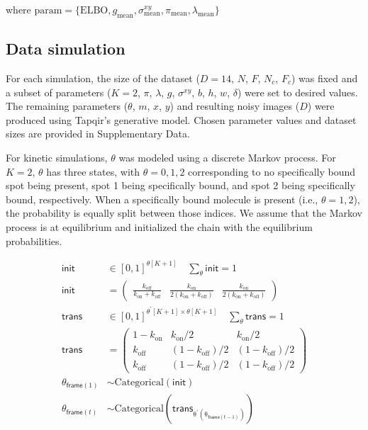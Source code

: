 \noindent where $\mathrm{param} = \{ \mathrm{ELBO}, g_\mathrm{mean}, \sigma^{xy}_\mathrm{mean}, \pi_\mathrm{mean}, \lambda_\mathrm{mean} \}$

\subsection*{Data simulation}

For each simulation, the size of the dataset ($D=14$, $N$, $F$, $N_c$, $F_c$) was fixed and a subset of parameters ($K=2$, $\pi$, $\lambda$, $g$, $\sigma^{xy}$, $b$, $h$, $w$, $\delta$) were set to desired values.  The remaining parameters ($\theta$, $m$, $x$, $y$) and resulting noisy images ($D$) were produced using Tapqir's generative model. Chosen parameter values and dataset sizes are provided in Supplementary Data.

For kinetic simulations, $\theta$ was modeled using a discrete Markov process. For $K=2$, $\theta$ has three states, with $\theta = 0, 1, 2$ corresponding to no specifically bound spot being present, spot 1 being specifically bound, and spot 2 being specifically bound, respectively. When a specifically bound molecule is present (i.e., $\theta = 1, 2$), the probability is equally split between those indices. We assume that the Markov process is at equilibrium and initialized the chain with the equilibrium probabilities.


\begin{subequations}
\begin{align}
    \mathsf{init} &\in [0, 1]^{\theta[K+1]} \quad \sum_{\theta} \mathsf{init} = 1 \\
    \mathsf{init} &= \begin{pmatrix} \frac{k_\mathrm{off}}{k_\mathrm{on} + k_\mathrm{off}} & \frac{k_\mathrm{on}}{2\left( k_\mathrm{on} + k_\mathrm{off} \right)} & \frac{k_\mathrm{on}}{2\left( k_\mathrm{on} + k_\mathrm{off} \right)} \end{pmatrix} \\
    \mathsf{trans} &\in [0, 1]^{\theta^\prime[K+1] \times \theta[K+1]} \quad \sum_{\theta} \mathsf{trans} = 1 \\
    \mathsf{trans} &= \begin{pmatrix} 1 - k_\mathrm{on} & k_\mathrm{on}/2 & k_\mathrm{on}/2 \\ k_\mathrm{off} & (1 - k_\mathrm{off})/2 & (1 - k_\mathrm{off})/2 \\ k_\mathrm{off} & (1 - k_\mathrm{off})/2 & (1 - k_\mathrm{off})/2 \end{pmatrix} \\
    \theta_{\mathsf{frame}(1)} &\sim \mathrm{Categorical(\mathsf{init})} \\
    \theta_{\mathsf{frame}(t)} &\sim \mathrm{Categorical(\mathsf{trans}_{\theta^\prime( \theta_{\mathsf{frame}(t-1)})})}
\end{align}
\end{subequations}

